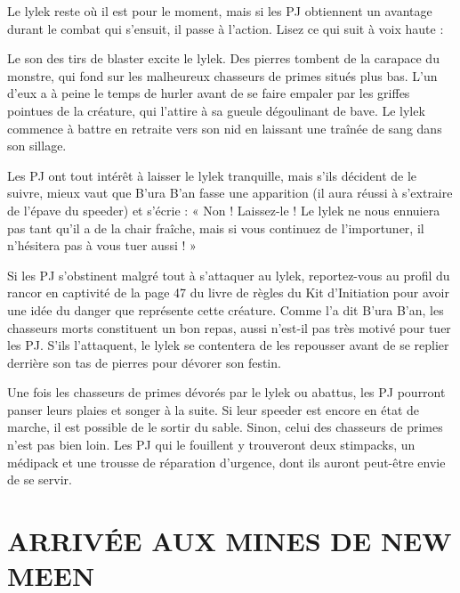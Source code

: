 \documentclass[a4paper,10pt,twoside,twocolumn,openany]{book}
\begin{document}
Le lylek reste où il est pour le moment, mais si les PJ
obtiennent un avantage \advantage durant le combat qui s’ensuit, il passe à l’action. Lisez ce qui suit à voix haute :
\begin{quotebox}

Le son des tirs de blaster excite le lylek. Des pierres
tombent de la carapace du monstre, qui fond sur
les malheureux chasseurs de primes situés plus bas.
L’un d’eux a à peine le temps de hurler avant de se
faire empaler par les griffes pointues de la créature,
qui l’attire à sa gueule dégoulinant de bave. Le lylek
commence à battre en retraite vers son nid en laissant une traînée de sang dans son sillage.
\end{quotebox}



Les PJ ont tout intérêt à laisser le lylek tranquille, mais
s’ils décident de le suivre, mieux vaut que B’ura B’an
fasse une apparition (il aura réussi à s’extraire de l’épave
du speeder) et s’écrie : « Non ! Laissez-le ! Le lylek ne
nous ennuiera pas tant qu’il a de la chair fraîche, mais si
vous continuez de l’importuner, il n’hésitera pas à vous
tuer aussi ! »


Si les PJ s’obstinent malgré tout à s’attaquer au lylek, reportez-vous au profil du rancor en captivité de la page 47 du livre de règles du Kit d’Initiation pour avoir une idée du
danger que représente cette créature. Comme l’a dit B’ura
B’an, les chasseurs morts constituent un bon repas, aussi
n’est-il pas très motivé pour tuer les PJ. S’ils l’attaquent,
le lylek se contentera de les repousser avant de se replier
derrière son tas de pierres pour dévorer son festin.

Une fois les chasseurs de primes dévorés par le lylek
ou abattus, les PJ pourront panser leurs plaies et songer
à la suite. Si leur speeder est encore en état de marche,
il est possible de le sortir du sable. Sinon, celui des chasseurs de primes n’est pas bien loin. Les PJ qui le fouillent
y trouveront deux stimpacks, un médipack et une trousse
de réparation d’urgence, dont ils auront peut-être envie
de se servir.

\section{ARRIVÉE AUX MINES DE
NEW MEEN}
\end{document}
